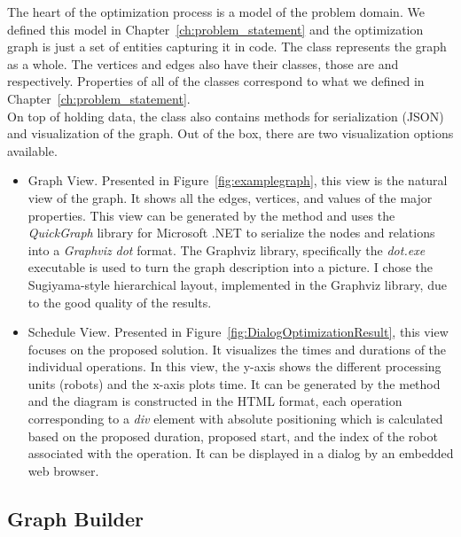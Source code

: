 The heart of the optimization process is a model of the problem domain.  We defined this model in Chapter~\ref{ch:problem_statement} and the optimization graph is just a set of entities capturing it in code. The  class represents the graph as a whole. The vertices and edges also have their classes, those are  and  respectively. Properties of all of the classes correspond to what we defined in Chapter~\ref{ch:problem_statement}. \\

On top of holding data, the  class also contains methods for serialization (JSON) and visualization of the graph. Out of the box, there are two visualization options available.

\begin{itemize}
    \item Graph View. Presented in Figure~\ref{fig:examplegraph}, this view is the natural view of the graph. It shows all the edges, vertices, and values of the major properties. This view can be generated by the  method and uses the \emph{QuickGraph} library for Microsoft .NET to serialize the nodes and relations into a \emph{Graphviz} \cite{Graphviz} \emph{dot} format. The Graphviz library, specifically the \emph{dot.exe} executable is used to turn the graph description into a picture. I chose the Sugiyama-style \cite{GraphvizLayout} hierarchical layout, implemented in the Graphviz library, due to the good quality of the results.

    \item Schedule View. Presented in Figure~\ref{fig:DialogOptimizationResult}, this view focuses on the proposed solution. It visualizes the times and durations of the individual operations. In this view, the y-axis shows the different processing units (robots) and the x-axis plots time. It can be generated by the  method and the diagram is constructed in the HTML format, each operation corresponding to a \emph{div} element with absolute positioning which is calculated based on the proposed duration, proposed start, and the index of the robot associated with the operation. It can be displayed in a dialog by an embedded web browser.

\end{itemize}

\subsection{Graph Builder}

